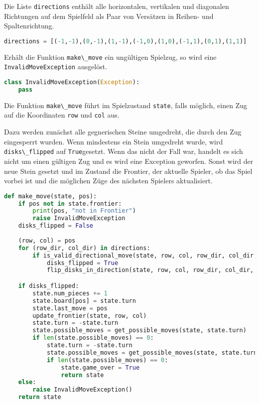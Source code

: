 Die Liste \passthrough{\lstinline!directions!} enthält alle
horizontalen, vertikalen und diagonalen Richtungen auf dem Spielfeld als
Paar von Versätzen in Reihen- und Spaltenrichtung.

\begin{lstlisting}[language=Python]
directions = [(-1,-1),(0,-1),(1,-1),(-1,0),(1,0),(-1,1),(0,1),(1,1)]
\end{lstlisting}

Erhält die Funktion \passthrough{\lstinline!make\_move!} ein ungültigen
Spielzug, so wird eine \passthrough{\lstinline!InvalidMoveException!}
ausgelöst.

\begin{lstlisting}[language=Python]
class InvalidMoveException(Exception):
    pass
\end{lstlisting}

Die Funktion \passthrough{\lstinline!make\_move!} führt im Spielzustand
\passthrough{\lstinline!state!}, falls möglich, einen Zug auf die
Koordinaten \passthrough{\lstinline!row!} und
\passthrough{\lstinline!col!} aus.

Dazu werden zunächst alle gegnerischen Steine umgedreht, die durch den
Zug eingesperrt wurden. Wenn mindestens ein Stein umgedreht wurde, wird
\passthrough{\lstinline!disks\_flipped!} auf
\passthrough{\lstinline!True!}gesetzt. Wenn das nicht der Fall war,
handelt es sich nicht um einen gültigen Zug und es wird eine Exception
geworfen. Sonst wird der neue Stein gesetzt und im Zustand die Frontier,
der aktuelle Spieler, ob das Spiel vorbei ist und die möglichen Züge des
nächsten Spielers aktualisiert.

\begin{lstlisting}[language=Python]
def make_move(state, pos):
    if pos not in state.frontier:
        print(pos, "not in Frontier")
        raise InvalidMoveException
    disks_flipped = False
    
    (row, col) = pos
    for (row_dir, col_dir) in directions:
        if is_valid_directional_move(state, row, col, row_dir, col_dir, state.turn):
            disks_flipped = True
            flip_disks_in_direction(state, row, col, row_dir, col_dir, state.turn)

    if disks_flipped:
        state.num_pieces += 1
        state.board[pos] = state.turn
        state.last_move = pos
        update_frontier(state, row, col)
        state.turn = -state.turn
        state.possible_moves = get_possible_moves(state, state.turn)
        if len(state.possible_moves) == 0:
            state.turn = -state.turn
            state.possible_moves = get_possible_moves(state, state.turn)
            if len(state.possible_moves) == 0:
                state.game_over = True
                return state
    else:
        raise InvalidMoveException()
    return state
\end{lstlisting}

